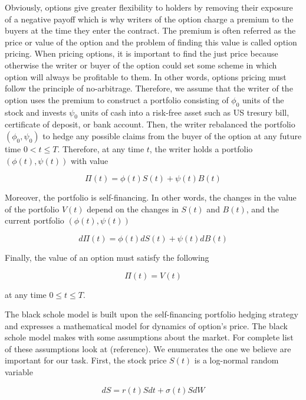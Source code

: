 Obviously, options give greater flexibility 
to holders by removing their exposure of a negative payoff which is why writers of 
the option charge a premium to the buyers at the time they enter the contract. 
The premium is often referred as the price or value of the option and the problem of finding this value is called option pricing. 
When pricing options, it is important to find the just price because 
otherwise the writer or buyer of the option could set some scheme in which option
will always be profitable to them. In other words, options pricing must follow
the principle of no-arbitrage. Therefore, we assume that the writer of the option
uses the premium to construct a portfolio consisting of $\phi_0$ units of the 
stock and invests $\psi_0$ units of cash into a risk-free asset such as US
tresury bill, certificate of deposit, or bank account. Then, the writer rebalanced
the portfolio $(\phi_0, \psi_0)$ to hedge any 
possible claims from the buyer of the option at any future time $0 < t \le T$. 
Therefore, at any time $t$, the writer holds a portfolio $(\phi(t), \psi(t))$ 
with value

\begin{equation}
  \Pi(t) = \phi(t)S(t) + \psi(t)B(t)
\end{equation}

Moreover, the portfolio is self-financing. In other words, the changes in the value
of the portfolio $V(t)$ depend on the changes in $S(t)$ and $B(t)$, and the current
portfolio $(\phi(t), \psi(t))$

\begin{equation}
  d\Pi(t) = \phi(t)dS(t) + \psi(t)dB(t)
\end{equation}

Finally, the value of an option must satisfy the following

\begin{equation}
  \Pi(t) = V(t)
\end{equation}

at any time $0 \le t \le T$.

The black schole model is built upon the self-financing portfolio hedging strategy 
and expresses a mathematical model for dynamics of option's price. 
The black schole model makes with some assumptions about the market. For complete
list of these assumptions look at (reference). We enumerates the one we believe 
are important for our task. First, the stock price $S(t)$ is a log-normal random
variable 

\begin{equation}
  dS = r(t)Sdt + \sigma(t) S dW
\end{equation}

